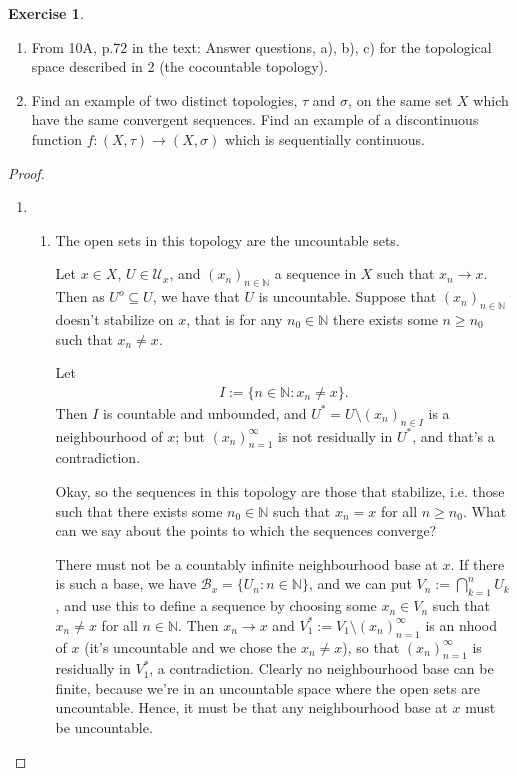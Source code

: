 \documentclass[12pt]{extarticle}
\newcommand{\set}[1]{\{#1\}}
\newcommand{\N}{\mathbb{N}}
\newcommand{\<}{\langle}
\renewcommand{\>}{\rangle}
\theoremstyle{definition}
\newtheorem{exercise}{Exercise}
\begin{document}
\begin{exercise}
  \begin{enumerate}
  \item
    From 10A, p.72 in the text: Answer questions, a), b), c) for the topological space described in 2 (the cocountable topology).
  \item
    Find an example of two distinct topologies, $\tau$ and $\sigma$, on the same set $X$ which have the same convergent sequences. Find an example of a discontinuous function $f:(X, \tau) \to (X, \sigma)$ which is sequentially continuous. 
  \end{enumerate}
\end{exercise}
\begin{proof}
  \begin{enumerate}
  \item
    \begin{enumerate}
    \item
      The open sets in this topology are the uncountable sets.

      Let $x \in X$, $U \in \mathcal{U}_x$, and $(x_n)_{n \in \N}$ a sequence in $X$ such that $x_n \to x$.
      Then as $U^o \subseteq U$, we have that $U$ is uncountable. Suppose that $(x_n)_{n \in \N}$ doesn't stabilize on $x$,
      that is for any $n_0 \in \N$ there exists some $n \geq n_0$ such that $x_n \neq x$.

      Let
      \begin{align*}
        I := \set{n \in \N: x_n \neq x}.
      \end{align*}
      Then $I$ is countable and unbounded, and $U^* = U \setminus (x_n)_{n \in I}$ is a neighbourhood of $x$; but $(x_n)_{n=1}^{\infty}$
      is not residually in $U^*$, and that's a contradiction.

      Okay, so the sequences in this topology are those that stabilize, i.e. those such that there exists some $n_0 \in \N$ such that $x_n = x$ for all $n \geq n_0$. What can we say about the points to which the sequences converge?

      There must not be a countably infinite neighbourhood base at $x$. If there is such a base, we have $\mathcal{B}_x = \set{U_n : n \in \N}$, and we can put $V_n := \bigcap\limits_{k=1}^n U_k$,
      and use this to define a sequence by choosing some $x_n \in V_n$ such that $x_n \neq x$ for all $n \in \N$. Then $x_n \to x$ and $ V_1^* := V_1 \setminus (x_n)_{n=1}^{\infty}$ is an nhood of $x$ (it's uncountable and we chose the $x_n \neq x$),
      so that $(x_n)_{n=1}^{\infty}$ is residually in $V_1^*$, a contradiction. Clearly no neighbourhood base can be finite, because we're in an uncountable space where the open sets are uncountable. Hence,
      it must be that any neighbourhood base at $x$ must be uncountable. 



\end{enumerate}
\end{enumerate}
\end{proof}
\end{document}
